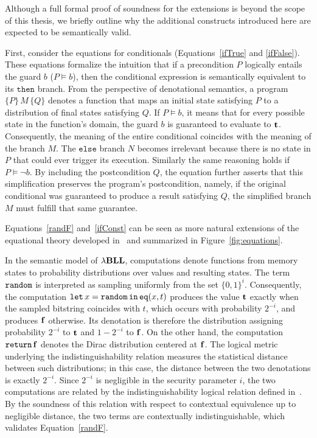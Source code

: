 Although a full formal proof of soundness for the extensions is beyond the scope of this thesis, we briefly outline why the additional constructs introduced here are expected to be semantically valid.

First, consider the equations for conditionals (Equations~\ref{ifTrue} and \ref{ifFalse}). These equations formalize the intuition that if a precondition $P$ logically entails the guard $b$ ($P\models b$), then the conditional expression is semantically equivalent to its $\mathtt{then}$ branch. From the perspective of denotational semantics, a program $\{P\}\, M \,\{Q\}$ denotes a function that maps an initial state satisfying $P$ to a distribution of final states satisfying $Q$. If $P\models b$, it means that for every possible state in the function's domain, the guard $b$ is guaranteed to evaluate to $\mathbf{t}$. Consequently, the meaning of the entire conditional coincides with the meaning of the branch $M$. The $\mathtt{else}$ branch $N$ becomes irrelevant because there is no state in $P$ that could ever trigger its execution. Similarly the same reasoning holds if $P \models \neg b$. By including the postcondition $Q$, the equation further asserts that this simplification preserves the program's postcondition, namely, if the original conditional was guaranteed to produce a result satisfying $Q$, the simplified branch $M$ must fulfill that same guarantee. 

Equations~\ref{randF} and~\ref{ifConst} can be seen as more natural extensions of the equational theory developed in~\cite{lago2024-extended} and summarized in Figure~\ref{fig:equations}.

In the semantic model of ${\lambda}\mathbf{BLL}$, computations denote functions from memory states to probability distributions over values and resulting states. The term $\mathtt{random}$ is interpreted as sampling uniformly from the set $\{0,1\}^i$. Consequently, the computation $\mathtt{let}\,x=\mathtt{random}\,\mathtt{in}\, \mathtt{eq}(x,t)$ produces the value $\mathbf{t}$ exactly when the sampled bitstring coincides with $t$, which occurs with probability $2^{-i}$, and produces $\mathbf{f}$ otherwise. Its denotation is therefore the distribution assigning probability $2^{-i}$ to $\mathbf{t}$ and $1-2^{-i}$ to $\mathbf{f}$. On the other hand, the computation $\mathtt{return}\, \mathbf{f}$ denotes the Dirac distribution centered at $\mathbf{f}$. The logical metric underlying the indistinguishability relation measures the statistical distance between such distributions; in this case, the distance between the two denotations is exactly $2^{-i}$. Since $2^{-i}$ is negligible in the security parameter $i$, the two computations are related by the indistinguishability logical relation defined in~\cite{lago2024computationalindistinguishabilitylogicalrelations}. By the soundness of this relation with respect to contextual equivalence up to negligible distance, the two terms are contextually indistinguishable, which validates Equation~\ref{randF}.

